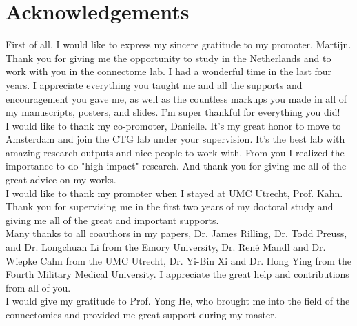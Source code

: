 \pagestyle{backmatter}

\chapter{Acknowledgements}

First of all, I would like to express my sincere gratitude to my promoter, Martijn. Thank you for giving me the opportunity to study in the Netherlands and to work with you in the connectome lab. I had a wonderful time in the last four years. I appreciate everything you taught me and all the supports and encouragement you gave me, as well as the countless markups you made in all of my manuscripts, posters, and slides. I'm super thankful for everything you did!\\

\noindent
I would like to thank my co-promoter, Danielle. It's my great honor to move to Amsterdam and join the CTG lab under your supervision. It's the best lab with amazing research outputs and nice people to work with. From you I realized the importance to do "high-impact" research. And thank you for giving me all of the great advice on my works.\\

\noindent
I would like to thank my promoter when I stayed at UMC Utrecht, Prof. Kahn. Thank you for supervising me in the first two years of my doctoral study and giving me all of the great and important supports.\\

\noindent
Many thanks to all coauthors in my papers, Dr. James Rilling, Dr. Todd Preuss, and Dr. Longchuan Li from the Emory University, Dr. René Mandl and Dr. Wiepke Cahn from the UMC Utrecht, Dr. Yi-Bin Xi and Dr. Hong Ying from the Fourth Military Medical University. I appreciate the great help and contributions from all of you. \\

\noindent
I would give my gratitude to Prof. Yong He, who brought me into the field of the connectomics and provided me great support during my master.\\

